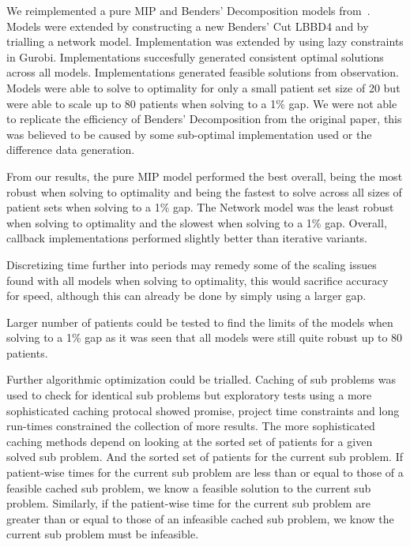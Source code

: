 We reimplemented a pure MIP and Benders' Decomposition models from~\cite{roshanaei2017propagating}. Models were extended by constructing a new Benders' Cut LBBD4 and by trialling a network model. Implementation was extended by using lazy constraints in Gurobi. Implementations succesfully generated consistent optimal solutions across all models. Implementations generated feasible solutions from observation. Models were able to solve to optimality for only a small patient set size of 20 but were able to scale up to 80 patients when solving to a 1\% gap. We were not able to replicate the efficiency of Benders' Decomposition from the original paper, this was believed to be caused by some sub-optimal implementation used or the difference data generation.  

From our results, the pure MIP model performed the best overall, being the most robust when solving to optimality and being the fastest to solve across all sizes of patient sets when solving to a 1\% gap. The Network model was the least robust when solving to optimality and the slowest when solving to a 1\% gap. Overall, callback implementations performed slightly better than iterative variants.

Discretizing time further into periods may remedy some of the scaling issues found with all models when solving to optimality, this would sacrifice accuracy for speed, although this can already be done by simply using a larger gap. 

Larger number of patients could be tested to find the limits of the models when solving to a 1\% gap as it was seen that all models were still quite robust up to 80 patients. 

Further algorithmic optimization could be trialled. Caching of sub problems was used to check for identical sub problems but exploratory tests using a more sophisticated caching protocal showed promise, project time constraints and long run-times constrained the collection of more results. The more sophisticated caching methods depend on looking at the sorted set of patients for a given solved sub problem. And the sorted set of patients for the current sub problem. If patient-wise times for the current sub problem are less than or equal to those of a feasible cached sub problem, we know a feasible solution to the current sub problem. Similarly, if the patient-wise time for the current sub problem are greater than or equal to those of an infeasible cached sub problem, we know the current sub problem must be infeasible.
